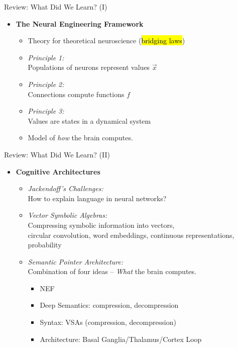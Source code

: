 \documentclass[handout,aspectratio=169]{beamer}
\begin{document}
\begin{frame}{Review: What Did We Learn? (I)}
	\begin{itemize}
		\item \textbf{The Neural Engineering Framework}\\[0.25cm]
		\begin{itemize}
			\setlength{\itemsep}{0.25cm}
			\item Theory for theoretical neuroscience (\hl{bridging laws})
			\item \emph{Principle 1:}\\Populations of neurons represent values $\vec x$
			\item \emph{Principle 2:}\\Connections compute functions $f$
			\item \emph{Principle 3:}\\Values are states in a dynamical system
			\item<2-> Model of \emph{how} the brain computes.   \only<5->{But hopefully useful!}
		\end{itemize}
	\end{itemize}
\end{frame}

\begin{frame}{Review: What Did We Learn? (II)}
	\begin{itemize}
		\item \textbf{Cognitive Architectures}\\[0.25cm]
		\begin{itemize}
			\setlength{\itemsep}{0.25cm}
			\item \emph{Jackendoff's Challenges:}\\
			How to explain language in neural networks?
			\item \emph{Vector Symbolic Algebras:}\\
			Compressing symbolic information into vectors,\\circular convolution, word embeddings, continuous representations, probability
			\item \emph{Semantic Pointer Architecture:}\\
			Combination of four ideas -- \emph{What} the brain computes.
			\begin{itemize}
				\setlength{\itemsep}{0.125cm}
				\item NEF
				\item Deep Semantics: compression, decompression
				\item Syntax: VSAs (compression, decompression)
				\item Architecture: Basal Ganglia/Thalamus/Cortex Loop
			\end{itemize}
		\end{itemize}
	\end{itemize}
\end{frame}
\end{document}
